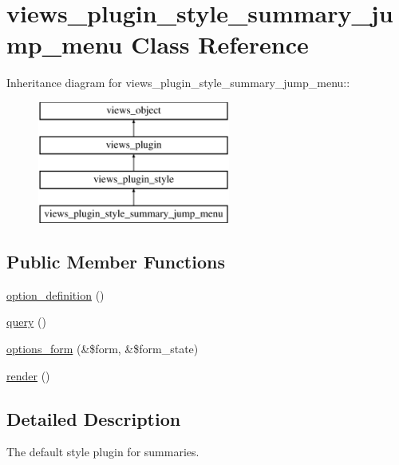 \hypertarget{classviews__plugin__style__summary__jump__menu}{
\section{views\_\-plugin\_\-style\_\-summary\_\-jump\_\-menu Class Reference}
\label{classviews__plugin__style__summary__jump__menu}
}
Inheritance diagram for views\_\-plugin\_\-style\_\-summary\_\-jump\_\-menu::\begin{figure}[H]
\begin{center}
\leavevmode
\includegraphics[height=4cm]{classviews__plugin__style__summary__jump__menu}
\end{center}
\end{figure}
\subsection*{Public Member Functions}
\begin{CompactItemize}
\item 
\hyperlink{classviews__plugin__style__summary__jump__menu_f8b62f282687c9670850c990c376f2c4}{option\_\-definition} ()
\item 
\hyperlink{classviews__plugin__style__summary__jump__menu_ee2a45ee02a7ce8d041a5b028758cf0b}{query} ()
\item 
\hyperlink{classviews__plugin__style__summary__jump__menu_b66730cfcd70ef23a0dbc05e80ad3d32}{options\_\-form} (\&\$form, \&\$form\_\-state)
\item 
\hyperlink{classviews__plugin__style__summary__jump__menu_7e9b8b44735067dc7ebb838e54a21a38}{render} ()
\end{CompactItemize}


\subsection{Detailed Description}
The default style plugin for summaries. 

